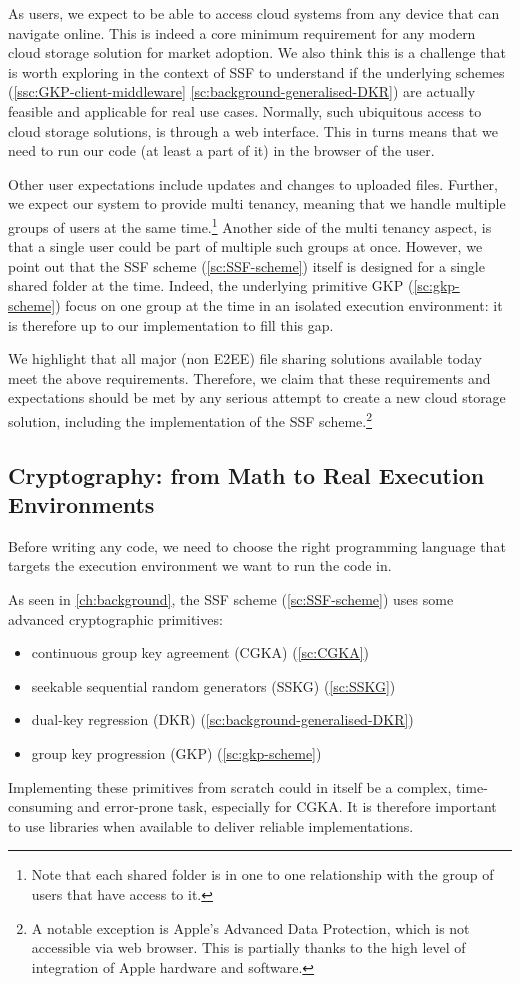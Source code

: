 As users, we expect to be able to access 
cloud systems from any device that can navigate online.
This is indeed a core minimum requirement for any modern
cloud storage solution for market adoption.
We also think this is a challenge that is worth exploring
in the context of SSF to understand if the underlying
schemes (\cref{ssc:GKP-client-middleware} \cref{sc:background-generalised-DKR})
are actually feasible and applicable for real use cases.
Normally, such ubiquitous access to cloud storage solutions,
is through a web interface.
This in turns means that we need to run our code  (at least a part of it) 
in the browser of the user.

Other user expectations include updates and changes to uploaded files.
Further, we expect our system to provide multi tenancy,
meaning that we handle multiple groups of users at the same time.\footnote{Note that each shared folder is in one to one relationship with the group of users that have access to it.} 
Another side of the multi tenancy aspect, is that a 
single user could be part of multiple such groups at once. 
However, we point out that the SSF scheme (\cref{sc:SSF-scheme}) 
itself is designed for a single shared folder at the time.
Indeed, the underlying primitive GKP (\cref{sc:gkp-scheme}) focus 
on one group at the time in an isolated execution environment:
it is therefore up to our implementation to fill this gap.

We highlight that all major (non E2EE) file sharing solutions available today meet the above requirements.
Therefore, we claim that these requirements and expectations should be met by any serious attempt to create a new cloud storage solution, including the implementation of the SSF scheme.\footnote{A notable exception is Apple's Advanced Data Protection, which is not accessible via web browser. This is partially thanks to the high level of integration of Apple hardware and software.}

\subsection{Cryptography: from Math to Real Execution Environments}\label{sc:abstract-to-real}

Before writing any code, we need to choose the right 
programming language that targets the execution environment
we want to run the code in.

As seen in \cref{ch:background}, the SSF scheme (\cref{sc:SSF-scheme})
uses some advanced cryptographic primitives:
\begin{itemize}
    \item continuous group key agreement (CGKA) (\cref{sc:CGKA})
    \item seekable sequential random generators (SSKG) (\cref{sc:SSKG})
    \item dual-key regression (DKR) (\cref{sc:background-generalised-DKR})
    \item group key progression (GKP) (\cref{sc:gkp-scheme})
\end{itemize}
Implementing these primitives from scratch could in itself
be a complex, time-consuming and error-prone task, especially for CGKA.
It is therefore important to use libraries when available
to deliver reliable implementations.

